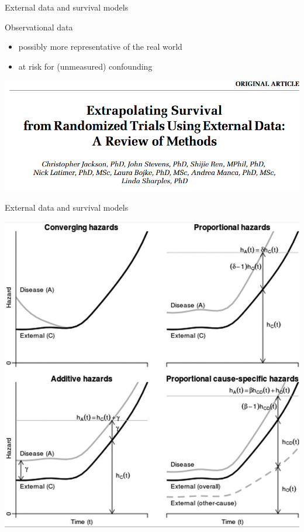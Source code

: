\documentclass[
  ignorenonframetext,
]{beamer}
\providecommand{\tightlist}{%
  \setlength{\itemsep}{0pt}\setlength{\parskip}{0pt}}
\begin{document}
\begin{frame}{External data and survival models}
\protect\hypertarget{external-data-and-survival-models-1}{}

Observational data

\begin{itemize}
\tightlist
\item
  possibly more representative of the real world
\item
  at risk for (unmeasured) confounding
\end{itemize}

\includegraphics[width=1\linewidth]{figures/jacksonext}

\end{frame}

\begin{frame}{External data and survival models}
\protect\hypertarget{external-data-and-survival-models-2}{}

\includegraphics[width=0.7\linewidth]{figures/jacksonfig3}

\end{frame}
\end{document}

